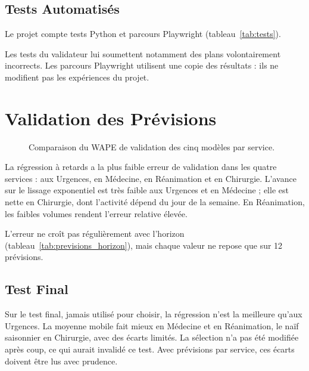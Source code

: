 \subsection{Tests Automatisés}
Le projet compte \NbTestsPython{} tests Python et \NbTestsNavigateur{} parcours Playwright (tableau~\ref{tab:tests}).



Les tests du validateur lui soumettent notamment des plans volontairement incorrects. Les parcours Playwright utilisent une copie des résultats : ils ne modifient pas les expériences du projet.

\section{Validation des Prévisions}



\begin{figure}[H]
    \centering
    \caption{Comparaison du WAPE de validation des cinq modèles par service.}
    \label{fig:model_comparison}
\end{figure}

La régression à retards a la plus faible erreur de validation dans les quatre services : \WapeValUrg{} aux Urgences, \WapeValMed{} en Médecine, \WapeValRea{} en Réanimation et \WapeValChi{} en Chirurgie. L'avance sur le lissage exponentiel est très faible aux Urgences et en Médecine ; elle est nette en Chirurgie, dont l'activité dépend du jour de la semaine. En Réanimation, les faibles volumes rendent l'erreur relative élevée.



L'erreur ne croît pas régulièrement avec l'horizon (tableau~\ref{tab:previsions_horizon}), mais chaque valeur ne repose que sur 12 prévisions.

\subsection{Test Final}


Sur le test final, jamais utilisé pour choisir, la régression n'est la meilleure qu'aux Urgences. La moyenne mobile fait mieux en Médecine et en Réanimation, le naïf saisonnier en Chirurgie, avec des écarts limités. La sélection n'a pas été modifiée après coup, ce qui aurait invalidé ce test. Avec \NbPrevTest{} prévisions par service, ces écarts doivent être lus avec prudence.

